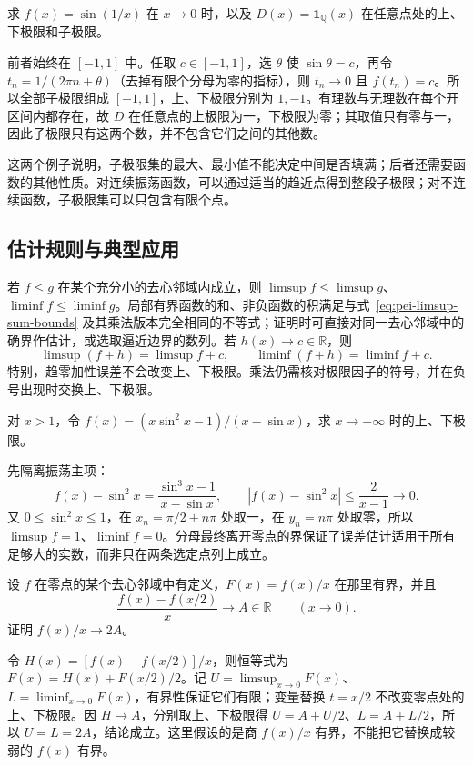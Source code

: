 \begin{example}
\label{ex:pei-oscillation-cluster-values}
求 $f(x)=\sin(1/x)$ 在 $x\to0$ 时，以及 $D(x)=\mathbf{1}_{\mathbb{Q}}(x)$ 在任意点处的上、下极限和子极限。
\end{example}
\begin{solve}
前者始终在 $[-1,1]$ 中。任取 $c\in[-1,1]$，选 $\theta$ 使 $\sin\theta=c$，再令 $t_n=1/(2\pi n+\theta)$（去掉有限个分母为零的指标），则 $t_n\to0$ 且 $f(t_n)=c$。所以全部子极限组成 $[-1,1]$，上、下极限分别为 $1,-1$。有理数与无理数在每个开区间内都存在，故 $D$ 在任意点的上极限为一，下极限为零；其取值只有零与一，因此子极限只有这两个数，并不包含它们之间的其他数。
\end{solve}

这两个例子说明，子极限集的最大、最小值不能决定中间是否填满；后者还需要函数的其他性质。对连续振荡函数，可以通过适当的趋近点得到整段子极限；对不连续函数，子极限集可以只包含有限个点。

\subsection{估计规则与典型应用}

若 $f\le g$ 在某个充分小的去心邻域内成立，则 $\limsup f\le\limsup g$、$\liminf f\le\liminf g$。局部有界函数的和、非负函数的积满足与式~\eqref{eq:pei-limsup-sum-bounds} 及其乘法版本完全相同的不等式；证明时可直接对同一去心邻域中的确界作估计，或选取逼近边界的数列。若 $h(x)\to c\in\mathbb{R}$，则
\[
    \limsup(f+h)=\limsup f+c,\qquad
    \liminf(f+h)=\liminf f+c.
\]
特别，趋零加性误差不会改变上、下极限。乘法仍需核对极限因子的符号，并在负号出现时交换上、下极限。

\begin{example}
\label{ex:pei-rational-oscillation}
对 $x>1$，令 $f(x)=(x\sin^2x-1)/(x-\sin x)$，求 $x\to+\infty$ 时的上、下极限。
\end{example}
\begin{solve}
先隔离振荡主项：
\[
    f(x)-\sin^2x=\frac{\sin^3x-1}{x-\sin x},\qquad
    |f(x)-\sin^2x|\le\frac2{x-1}\longrightarrow0.
\]
又 $0\le\sin^2x\le1$，在 $x_n=\pi/2+n\pi$ 处取一，在 $y_n=n\pi$ 处取零，所以 $\limsup f=1$、$\liminf f=0$。分母最终离开零点的界保证了误差估计适用于所有足够大的实数，而非只在两条选定点列上成立。
\end{solve}

\begin{example}
\label{ex:pei-dyadic-difference}
设 $f$ 在零点的某个去心邻域中有定义，$F(x)=f(x)/x$ 在那里有界，并且
\[
    \frac{f(x)-f(x/2)}x\longrightarrow A\in\mathbb{R}
    \qquad(x\to0).
\]
证明 $f(x)/x\to2A$。
\end{example}
\begin{solve}
令 $H(x)=[f(x)-f(x/2)]/x$，则恒等式为 $F(x)=H(x)+F(x/2)/2$。记 $U=\limsup_{x\to0}F(x)$、$L=\liminf_{x\to0}F(x)$，有界性保证它们有限；变量替换 $t=x/2$ 不改变零点处的上、下极限。因 $H\to A$，分别取上、下极限得 $U=A+U/2$、$L=A+L/2$，所以 $U=L=2A$，结论成立。这里假设的是商 $f(x)/x$ 有界，不能把它替换成较弱的 $f(x)$ 有界。
\end{solve}

